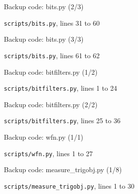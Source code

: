 \begin{frame}{Backup code: bits.py (2/3)}
  \vspace{0pt}\par
  {\tiny\color{lightgrey}\texttt{scripts/bits.py}, lines 31 to 60\par}
  
\end{frame}
\begin{frame}{Backup code: bits.py (3/3)}
  \vspace{0pt}\par
  {\tiny\color{lightgrey}\texttt{scripts/bits.py}, lines 61 to 62\par}
  
\end{frame}
\begin{frame}{Backup code: bitfilters.py (1/2)}
  \vspace{0pt}\par
  {\tiny\color{lightgrey}\texttt{scripts/bitfilters.py}, lines 1 to 24\par}
  
\end{frame}
\begin{frame}{Backup code: bitfilters.py (2/2)}
  \vspace{0pt}\par
  {\tiny\color{lightgrey}\texttt{scripts/bitfilters.py}, lines 25 to 36\par}
  
\end{frame}
\begin{frame}{Backup code: wfn.py (1/1)}
  \vspace{0pt}\par
  {\tiny\color{lightgrey}\texttt{scripts/wfn.py}, lines 1 to 27\par}
  
\end{frame}
\begin{frame}{Backup code: measure\_trigobj.py (1/8)}
  \vspace{0pt}\par
  {\tiny\color{lightgrey}\texttt{scripts/measure\_trigobj.py}, lines 1 to 30\par}
  
\end{frame}
